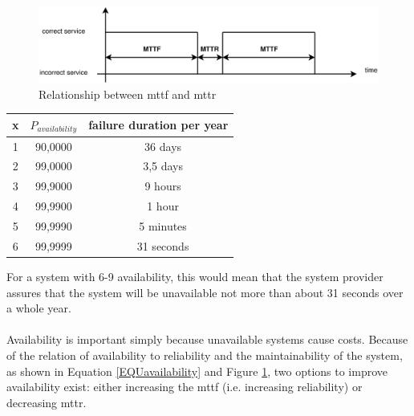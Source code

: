 \begin{figure}
    \centering
    \includegraphics[width=1\textwidth]{figures/availability}
    \caption{Relationship between \gls{mttf} and \gls{mttr}}
    \label{fig:relmttfmttr}
\end{figure}
\begin{center}
\begin{tabular}{ c | c c  }
 \label{table:x-9}
  x & $P_{availability}$ & failure duration per year \\ \hline
  1 & 90,0000    & ~ 36 days \\
  2 & 99,0000    & ~ 3,5 days  \\
  3 & 99,9000    & ~ 9 hours \\
  4 & 99,9900    & ~ 1 hour \\
  5 & 99,9990    & ~ 5 minutes \\
  6 & 99,9999    & ~ 31 seconds \\ 
  
\end{tabular}
\end{center}
For a system with 6-9 availability, this would mean that the system provider assures that the system will be unavailable not more than about 31 seconds over a
whole year.
\\
\\
Availability is important simply because unavailable systems cause costs. Because of the relation of availability to reliability and the maintainability
of the system, as shown in Equation \ref{EQUavailability} and Figure \ref{fig:relmttfmttr}, two options to improve availability exist: either increasing
the \gls{mttf} (i.e. increasing reliability) or decreasing \gls{mttr}.
